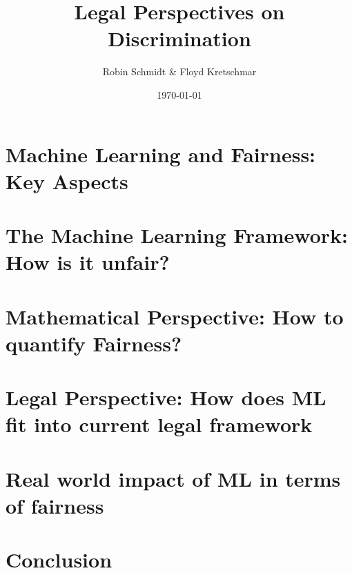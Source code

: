 \documentclass[9pt, t, aspectratio=169]{beamer}
\title{Legal Perspectives on Discrimination}
\subtitle{Robin Schmidt \& Floyd Kretschmar}
\institute{\texttt{[image: assets/uni\_logo\_dark.png]}}
\date{\today}
\begin{document}
\titlepage

\section{Machine Learning and Fairness: Key Aspects}

\section{The Machine Learning Framework: How is it unfair?}


\section{Mathematical Perspective: How to quantify Fairness?}

\section{Legal Perspective: How does ML fit into current legal framework}

\section{Real world impact of ML in terms of fairness}

\section{Conclusion}

\end{document}
